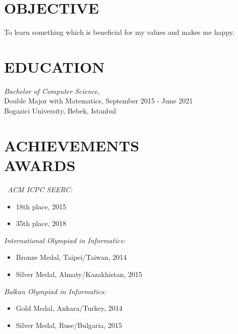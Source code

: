 \documentclass[margin, 10pt]{res} %
\begin{document}
\begin{resume}

 
\section{OBJECTIVE}  
To learn something which is beneficial for my values and makes me happy.


\section{EDUCATION}

{\sl Bachelor of Computer Science,} \\
{Double Major with Matematics,} \hfill September 2015 - June 2021 \\
Bogazici University, Bebek, Istanbul
 
\section{ACHIEVEMENTS \\ AWARDS}
{\sl \, ACM ICPC SEERC:} 
\begin{itemize}
	\item 18th place, 2015
	\item 35th place, 2018
\end{itemize}

{\sl International Olympiad in Informatics:}
\begin{itemize}
	\item Bronze Medal, Taipei/Taiwan, 2014
    \item Silver Medal, Almaty/Kazakhistan, 2015
\end{itemize}

{\sl Balkan Olympiad in Informatics:}
\begin{itemize}
	\item Gold Medal, Ankara/Turkey, 2014
    \item Silver Medal, Ruse/Bulgaria, 2015
\end{itemize}


\end{resume}
\end{document}
